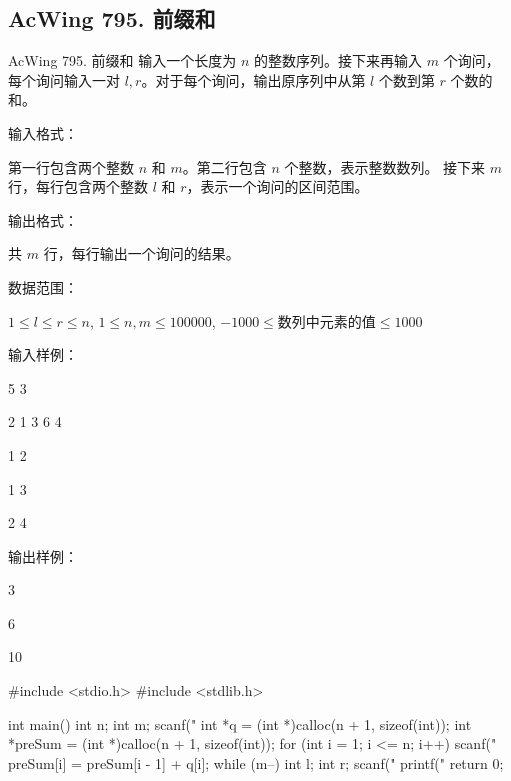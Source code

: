 \subsection{AcWing 795. 前缀和}
\begin{titledbox}{AcWing 795. 前缀和}
    输入一个长度为 $n$ 的整数序列。接下来再输入 $m$ 个询问，每个询问输入一对 $l, r$。对于每个询问，输出原序列中从第 $l$ 个数到第 $r$ 个数的和。
    
    输入格式：

    第一行包含两个整数 $n$ 和 $m$。第二行包含 $n$ 个整数，表示整数数列。
    接下来 $m$ 行，每行包含两个整数 $l$ 和 $r$，表示一个询问的区间范围。
    
    输出格式：

    共 $m$ 行，每行输出一个询问的结果。

    数据范围：

    $1 \le l \le r \le n$, $1 \le n,m \le 100000$, $-1000 \le \text{数列中元素的值} \le 1000$

    输入样例：

    5 3

    2 1 3 6 4
    
    1 2
    
    1 3
    
    2 4
    
    输出样例：

    3
    
    6
    
    10
\end{titledbox}

\begin{mycpponecol}[前缀和]
#include <stdio.h>
#include <stdlib.h>

int main()
{
    int n;
    int m;
    scanf("%
    int *q = (int *)calloc(n + 1, sizeof(int));
    int *preSum = (int *)calloc(n + 1, sizeof(int));
    for (int i = 1; i <= n; i++) {
        scanf("%
        preSum[i] = preSum[i - 1] + q[i];
    }
    while (m--) {
        int l;
        int r;
        scanf("%
        printf("%
    }
    return 0;
}
\end{mycpponecol}

